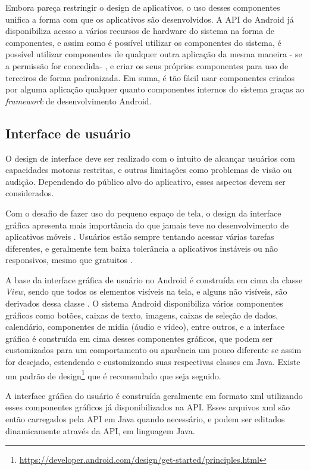 Embora pareça restringir o design de aplicativos, o uso desses componentes unifica a forma com que os aplicativos são desenvolvidos. A API do Android já disponibiliza acesso a vários recursos de hardware do sistema na forma de componentes, e assim como é possível utilizar os componentes do sistema, é possível utilizar componentes de qualquer outra aplicação da mesma maneira - se a permissão for concedida- , e criar os seus próprios componentes para uso de terceiros de forma padronizada. Em suma, é tão fácil usar componentes criados por alguma aplicação qualquer quanto componentes internos do sistema graças ao \textit{framework} de desenvolvimento Android.

\subsection{Interface de usuário}

O design de interface deve ser realizado com o intuito de alcançar usuários com capacidades motoras restritas, e outras limitações como problemas de visão ou audição. Dependendo do público alvo do aplicativo, esses aspectos devem ser considerados.

Com o desafio de fazer uso do pequeno espaço de tela, o design da interface gráfica apresenta mais importância do que jamais teve no desenvolvimento de aplicativos móveis \cite{eswissues}. Usuários estão sempre tentando acessar várias tarefas diferentes, e geralmente tem baixa tolerância a aplicativos instáveis ou não responsivos, mesmo que gratuitos \cite{eswmobile}. 

A base da interface gráfica de usuário no Android é construída em cima da classe \textit{View}, sendo que todos os elementos visíveis na tela, e alguns não visíveis, são derivados dessa classe \cite{androidarch2010}. O sistema Android disponibiliza vários componentes gráficos como botões, caixas de texto, imagens, caixas de seleção de dados, calendário, componentes de mídia (áudio e vídeo), entre outros, e a interface gráfica é construída em cima desses componentes gráficos, que podem ser customizados para um comportamento ou aparência um pouco diferente se assim for desejado, estendendo e customizando suas respectivas classes em Java. Existe um padrão de design\footnote{\url{https://developer.android.com/design/get-started/principles.html}} que é recomendado que seja seguido.

A interface gráfica do usuário é construída geralmente em formato xml utilizando esses componentes gráficos já disponibilizados na API. Esses arquivos xml são então carregados pela API em Java quando necessário, e podem ser editados dinamicamente através da API, em linguagem Java.

